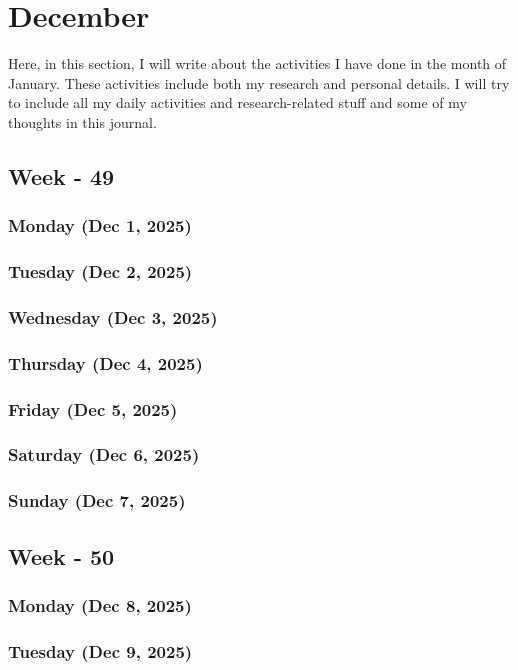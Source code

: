 \chapter{December}
\label{chap:December}
\hspace{1cm}
Here, in this section, I will write about the activities I have done in the month of January\cite{zhou2015}. These activities include both my research and personal details. I will try to include all my daily activities and research-related stuff and some of my thoughts in this journal.

\section{Week - 49}
\subsection*{Monday (Dec 1, 2025)}
\subsection*{Tuesday (Dec 2, 2025)}
\subsection*{Wednesday (Dec 3, 2025)}
\subsection*{Thursday (Dec 4, 2025)}
\subsection*{Friday (Dec 5, 2025)}
\subsection*{Saturday (Dec 6, 2025)}
\subsection*{Sunday (Dec 7, 2025)}

\section{Week - 50}
\subsection*{Monday (Dec 8, 2025)}
\subsection*{Tuesday (Dec 9, 2025)}
